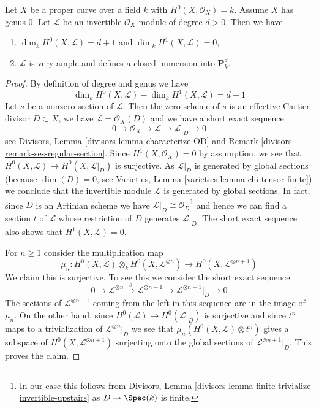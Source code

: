 \begin{lemma}
\label{lemma-genus-zero-positive-degree}
Let $X$ be a proper curve over a field $k$ with $H^0(X, \mathcal{O}_X) = k$.
Assume $X$ has genus $0$. Let $\mathcal{L}$ be an invertible
$\mathcal{O}_X$-module of degree $d > 0$. Then we have
\begin{enumerate}
\item $\dim_k H^0(X, \mathcal{L}) = d + 1$ and $\dim_k H^1(X, \mathcal{L}) = 0$,
\item $\mathcal{L}$ is very ample and defines a closed immersion into
$\mathbf{P}^d_k$.
\end{enumerate}
\end{lemma}

\begin{proof}
By definition of degree and genus we have
$$
\dim_k H^0(X, \mathcal{L}) - \dim_k H^1(X, \mathcal{L}) = d + 1
$$
Let $s$ be a nonzero section of $\mathcal{L}$.
Then the zero scheme of $s$ is an effective Cartier
divisor $D \subset X$, we have $\mathcal{L} = \mathcal{O}_X(D)$ and
we have a short exact sequence
$$
0 \to \mathcal{O}_X \to \mathcal{L} \to \mathcal{L}|_D \to 0
$$
see Divisors, Lemma \ref{divisors-lemma-characterize-OD} and
Remark \ref{divisors-remark-ses-regular-section}.
Since $H^1(X, \mathcal{O}_X) = 0$ by assumption, we see that
$H^0(X, \mathcal{L}) \to H^0(X, \mathcal{L}|_D)$ is surjective.
As $\mathcal{L}|_D$ is generated by global sections
(because $\dim(D) = 0$, see
Varieties, Lemma \ref{varieties-lemma-chi-tensor-finite})
we conclude that the invertible module $\mathcal{L}$
is generated by global sections.
In fact, since $D$ is an Artinian scheme we have
$\mathcal{L}|_D \cong \mathcal{O}_D$\footnote{In our case this
follows from Divisors, Lemma
\ref{divisors-lemma-finite-trivialize-invertible-upstairs}
as $D \to \Spec(k)$ is finite.} and hence we can
find a section $t$ of $\mathcal{L}$ whose restriction
of $D$ generates $\mathcal{L}|_D$.
The short exact sequence also shows that $H^1(X, \mathcal{L}) = 0$.

\medskip\noindent
For $n \geq 1$ consider the multiplication map
$$
\mu_n :
H^0(X, \mathcal{L}) \otimes_k H^0(X, \mathcal{L}^{\otimes n})
\longrightarrow
H^0(X, \mathcal{L}^{\otimes n + 1})
$$
We claim this is surjective. To see this we consider the short exact
sequence
$$
0 \to \mathcal{L}^{\otimes n} \xrightarrow{s}
\mathcal{L}^{\otimes n + 1} \to \mathcal{L}^{\otimes n + 1}|_D \to 0
$$
The sections of $\mathcal{L}^{\otimes n + 1}$ coming from the left in this
sequence are in the image of $\mu_n$. On the other hand, since
$H^0(\mathcal{L}) \to H^0(\mathcal{L}|_D)$ is surjective and since
$t^n$ maps to a trivialization of $\mathcal{L}^{\otimes n}|_D$
we see that $\mu_n(H^0(X, \mathcal{L}) \otimes t^n)$ gives a subspace
of $H^0(X, \mathcal{L}^{\otimes n + 1})$ surjecting onto the global sections of
$\mathcal{L}^{\otimes n + 1}|_D$. This proves the claim.


\end{proof}
